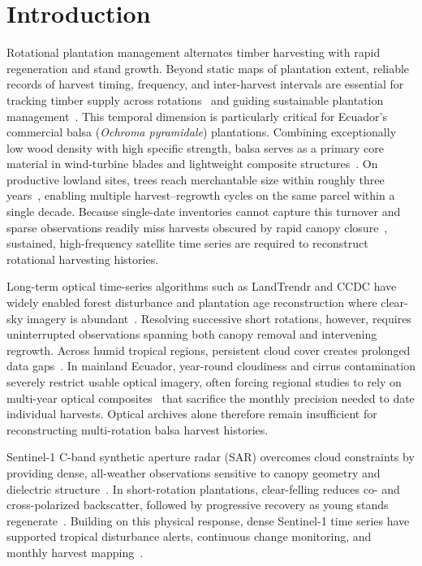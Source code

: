 \section{Introduction}
\label{sec:introduction}

Rotational plantation management alternates timber harvesting with rapid regeneration and stand growth. Beyond static maps of plantation extent, reliable records of harvest timing, frequency, and inter-harvest intervals are essential for tracking timber supply across rotations~\citep{McMahon2019EucalyptusRotations} and guiding sustainable plantation management~\citep{Cortes2023PlantationHarvesting}. This temporal dimension is particularly critical for Ecuador's commercial balsa (\textit{Ochroma pyramidale}) plantations. Combining exceptionally low wood density with high specific strength, balsa serves as a primary core material in wind-turbine blades and lightweight composite structures~\citep{Borrega2015Balsa_mechanics}. On productive lowland sites, trees reach merchantable size within roughly three years~\citep{CanadasLopez2019BalsaGrowth}, enabling multiple harvest--regrowth cycles on the same parcel within a single decade. Because single-date inventories cannot capture this turnover and sparse observations readily miss harvests obscured by rapid canopy closure~\citep{Huang2026EucalyptusAge}, sustained, high-frequency satellite time series are required to reconstruct rotational harvesting histories.

Long-term optical time-series algorithms such as LandTrendr and CCDC have widely enabled forest disturbance and plantation age reconstruction where clear-sky imagery is abundant~\citep{Kennedy2010LandTrendr,Zhu2014CCDC,Huang2026EucalyptusAge}. Resolving successive short rotations, however, requires uninterrupted observations spanning both canopy removal and intervening regrowth. Across humid tropical regions, persistent cloud cover creates prolonged data gaps~\citep{FloresAnderson2023TropicalCloudFreeOptical}. In mainland Ecuador, year-round cloudiness and cirrus contamination severely restrict usable optical imagery, often forcing regional studies to rely on multi-year optical composites~\citep{OchoaBrito2023EcuadorCropland,AlvarezMendoza2019CirrusEcuador} that sacrifice the monthly precision needed to date individual harvests. Optical archives alone therefore remain insufficient for reconstructing multi-rotation balsa harvest histories.

Sentinel-1 C-band synthetic aperture radar (SAR) overcomes cloud constraints by providing dense, all-weather observations sensitive to canopy geometry and dielectric structure~\citep{Torres2012S1,Reiche2021CongoAlerts}. In short-rotation plantations, clear-felling reduces co- and cross-polarized backscatter, followed by progressive recovery as young stands regenerate~\citep{Spracklen2021Acacia}. Building on this physical response, dense Sentinel-1 time series have supported tropical disturbance alerts, continuous change monitoring, and monthly harvest mapping~\citep{Reiche2021CongoAlerts,Bullock2022CCDC_S1,Zhao2022MonthlyHarvest,Balling2023Texture}.

